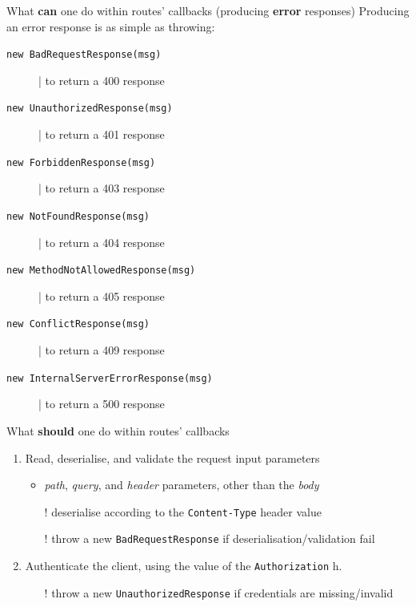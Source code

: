 \documentclass[presentation]{beamer}\mode<presentation>{\usetheme{AMSBolognaFC}}
\begin{document}
\begin{frame}[allowframebreaks]
    \framebreak

    \begin{block}{What \textbf{can} one do within routes' callbacks (producing \textbf{error} responses)}
        Producing an error response is as simple as \alert{throwing}:
        \begin{description}
            \item[\texttt{new BadRequestResponse(msg)}] | to return a 400 response
            \item[\texttt{new UnauthorizedResponse(msg)}] | to return a 401 response
            \item[\texttt{new ForbiddenResponse(msg)}] | to return a 403 response
            \item[\texttt{new NotFoundResponse(msg)}] | to return a 404 response
            \item[\texttt{new MethodNotAllowedResponse(msg)}] | to return a 405 response
            \item[\texttt{new ConflictResponse(msg)}] | to return a 409 response
            \item[\texttt{new InternalServerErrorResponse(msg)}] | to return a 500 response
        \end{description}
    \end{block}

    \framebreak

    \begin{block}{What \textbf{should} one do within routes' callbacks}
        \begin{enumerate}
            \item Read, deserialise, and validate the request \alert{input} parameters
            \begin{itemize}
                \item \emph{path}, \emph{query}, and \emph{header} parameters, other than the \emph{body}
                \item[!] deserialise according to the \texttt{Content-Type} header value
                \item[!] throw a new \texttt{BadRequestResponse} if deserialisation/validation fail
            \end{itemize}

            \item \alert{Authenticate} the client, using the value of the \texttt{Authorization} h.
            \begin{itemize}
                \item[!] throw a new \texttt{UnauthorizedResponse} if credentials are missing/invalid
            \end{itemize}


\end{enumerate}
\end{block}
\end{frame}
\end{document}

